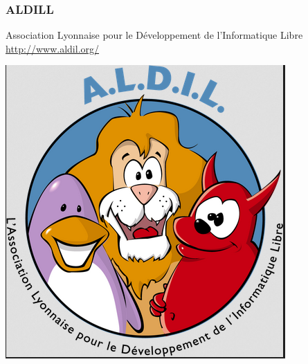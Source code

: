 \documentclass{beamer}
\begin{document}
\begin{frame}
\frametitle{ALDILL}

\begin{block}{Association Lyonnaise pour le Développement de l'Informatique Libre}
\url{http://www.aldil.org/}
\end{block}
\begin{center}
\includegraphics[scale=0.5] {./images/Aldill.png}
\end{center} 
\end{frame}
\end{document}
